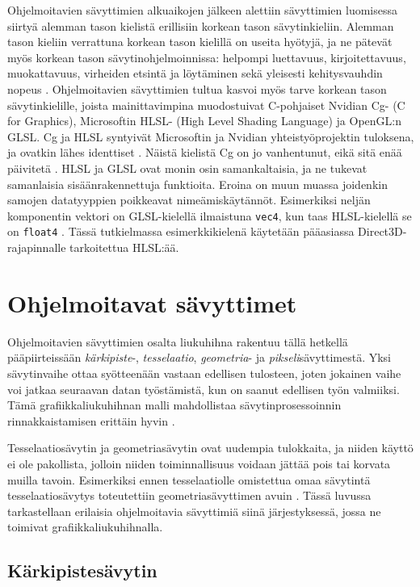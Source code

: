 \documentclass[finnish]{tktltiki2}
\theoremstyle{definition}
\theoremstyle{remark}
\begin{document}
Ohjelmoitavien sävyttimien alkuaikojen jälkeen alettiin sävyttimien luomisessa siirtyä alemman tason kielistä erillisiin korkean tason sävytinkieliin. Alemman tason kieliin verrattuna korkean tason kielillä on useita hyötyjä, ja ne pätevät myös korkean tason sävytinohjelmoinnissa: helpompi luettavuus, kirjoitettavuus, muokattavuus, virheiden etsintä ja löytäminen sekä yleisesti kehitysvauhdin nopeus \cite[s.183-185]{She08}. Ohjelmoitavien sävyttimien tultua kasvoi myös tarve korkean tason sävytinkielille, joista mainittavimpina muodostuivat C-pohjaiset Nvidian Cg- (C for Graphics), \cite{Nvi03} Microsoftin HLSL- (High Level Shading Language) ja OpenGL:n \cite{Khr15} GLSL. Cg ja HLSL syntyivät Microsoftin ja Nvidian yhteistyöprojektin tuloksena, ja ovatkin lähes identtiset \cite[s. 198]{She08}. Näistä kielistä Cg on jo vanhentunut, eikä sitä enää päivitetä \cite{Nvi12}. HLSL ja GLSL ovat monin osin samankaltaisia, ja ne tukevat samanlaisia sisäänrakennettuja funktioita. Eroina on muun muassa joidenkin samojen datatyyppien poikkeavat nimeämiskäytännöt. Esimerkiksi neljän komponentin vektori on GLSL-kielellä ilmaistuna \texttt{vec4}, kun taas HLSL-kielellä se on \texttt{float4} \cite[s. 198]{She08}. Tässä tutkielmassa esimerkkikielenä käytetään pääasiassa Direct3D-rajapinnalle tarkoitettua HLSL:ää.

\section{Ohjelmoitavat sävyttimet}

Ohjelmoitavien sävyttimien osalta liukuhihna rakentuu tällä hetkellä pääpiirteissään \emph{kärkipiste}-, \emph{tesselaatio}, \emph{geometria}- ja \emph{pikseli}sävyttimestä. Yksi sävytinvaihe ottaa syötteenään vastaan edellisen tulosteen, joten jokainen vaihe voi jatkaa seuraavan datan työstämistä, kun on saanut edellisen työn valmiiksi. Tämä grafiikkaliukuhihnan malli mahdollistaa sävytinprosessoinnin rinnakkaistamisen erittäin hyvin \cite{Ake02}. 

Tesselaatiosävytin ja geometriasävytin ovat uudempia tulokkaita, ja niiden käyttö ei ole pakollista, jolloin niiden toiminnallisuus voidaan jättää pois tai korvata muilla tavoin. Esimerkiksi ennen tesselaatiolle omistettua omaa sävytintä tesselaatiosävytys toteutettiin geometriasävyttimen avuin \cite{Sch14}. Tässä luvussa tarkastellaan erilaisia ohjelmoitavia sävyttimiä siinä järjestyksessä, jossa ne toimivat grafiikkaliukuhihnalla.

\subsection{Kärkipistesävytin}
\end{document}
